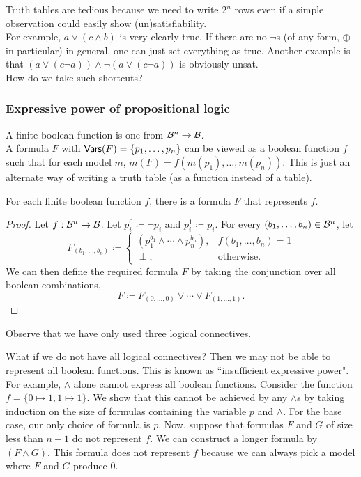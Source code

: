 Truth tables are tedious because we need to write $2^n$ rows even if a simple observation could easily show (un)satisfiability.\\
For example, $a \vee (c \wedge b)$ is very clearly true. If there are no $\neg$s (of any form, $\oplus$ in particular) in general, one can just set everything as true. Another example is that $(a \vee (c \neg a))\wedge\neg (a \vee (c \neg a))$ is obviously unsat.\\
How do we take such shortcuts?

\subsubsection{Expressive power of propositional logic}

A finite boolean function is one from $\mathcal{B}^n\to\mathcal{B}$.\\
A formula $F$ with $\mathsf{Vars}(F)=\{p_1,\ldots,p_n\}$ can be viewed as a boolean function $f$ such that for each model $m$, $m(F)=f(m(p_1),\ldots,m(p_n))$. This is just an alternate way of writing a truth table (as a function instead of a table).

\begin{theorem}
For each finite boolean function $f$, there is a formula $F$ that represents $f$.
\end{theorem}
\begin{proof}
Let $f:\mathcal{B}^n\to\mathcal{B}$. Let $p_i^0\coloneqq\neg p_i$ and $p_i^1\coloneqq p_i$. For every $(b_1,\ldots,b_n)\in\mathcal{B}^n$, let
\[
    F_{(b_1,\ldots,b_n)} \coloneqq
    \begin{cases}
        (p_1^{b_1}\wedge\cdots\wedge p_n^{b_n}), & f(b_1,\ldots,b_n)=1 \\
        \perp, & \text{otherwise.}
    \end{cases}
\]
We can then define the required formula $F$ by taking the conjunction over all boolean combinations,
\[ F \coloneqq F_{(0,\ldots,0)} \vee \cdots \vee F_{(1,\ldots,1)}. \]
\end{proof}

Observe that we have only used three logical connectives.

What if we do not have all logical connectives? Then we may not be able to represent all boolean functions. This is known as ``insufficient expressive power".\\

For example, $\wedge$ alone cannot express all boolean functions. Consider the function $f=\{0\mapsto 1, 1\mapsto 1\}$. We show that this cannot be achieved by any $\wedge$s by taking induction on the size of formulas containing the variable $p$ and $\wedge$. For the base case, our only choice of formula is $p$. Now, suppose that formulas $F$ and $G$ of size less than $n-1$ do not represent $f$. We can construct a longer formula by $(F\wedge G)$. This formula does not represent $f$ because we can always pick a model where $F$ and $G$ produce $0$.

